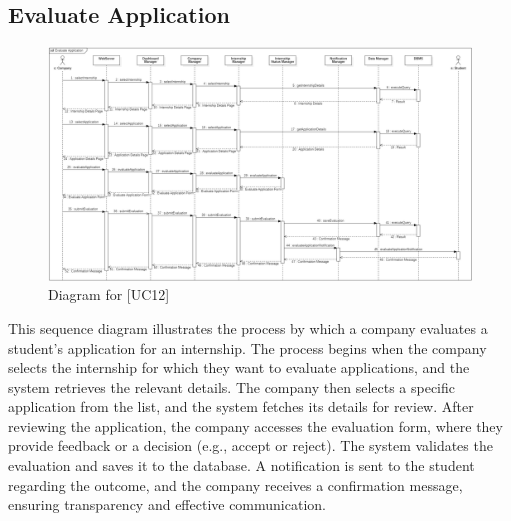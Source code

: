 \subsection{Evaluate Application}
\begin{figure} [H]
    \centering
    \includegraphics[width=1\linewidth]{DD/Images/Runtime Sequence Diagram Images/evaluate_application.png}
    \caption{Diagram for [UC12]}
    \label{fig: Evaluate Application Diagram}
\end{figure}
This sequence diagram illustrates the process by which a company evaluates a student’s application for an internship. The process begins when the company selects the internship for which they want to evaluate applications, and the system retrieves the relevant details. The company then selects a specific application from the list, and the system fetches its details for review. After reviewing the application, the company accesses the evaluation form, where they provide feedback or a decision (e.g., accept or reject). The system validates the evaluation and saves it to the database. A notification is sent to the student regarding the outcome, and the company receives a confirmation message, ensuring transparency and effective communication.

